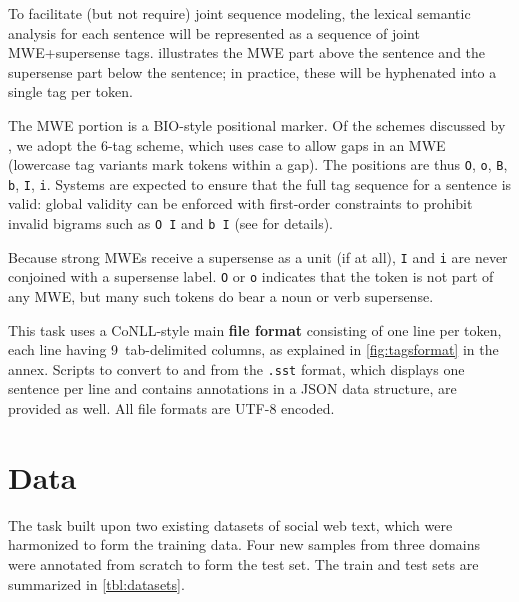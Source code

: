 \documentclass[11pt,letterpaper]{article}
\newcommand{\shortversion}[1]{}
\newcommand{\longversion}[1]{#1} %
\begin{document}
\longversion{To facilitate (but not require) joint sequence modeling, 
the lexical semantic}\shortversion{The} analysis for each sentence will be represented as 
a sequence of joint MWE+supersense tags.  illustrates 
the MWE part above the sentence and the supersense part below\longversion{ the sentence}; 
in practice, these will be hyphenated into a single tag per token.

The MWE portion is a BIO-style \citep{ramshaw-95} 
positional marker. Of the schemes discussed by \citet{schneider-14}, 
we adopt the 6-tag scheme, which uses case to allow gaps in an MWE (lowercase tag variants mark 
tokens within a gap).
The positions are thus \texttt{O}, \texttt{o}, \texttt{B}, \texttt{b},
\texttt{I}, \texttt{i}.
Systems are expected to ensure that the full tag sequence for a sentence is valid: 
global validity can be enforced with first-order constraints 
to prohibit invalid bigrams such as \texttt{O~I} and \texttt{b~I} (see \citealp{schneider-14} for details).

Because strong MWEs receive a supersense as a unit (if at all), 
\texttt{I} and \texttt{i} are never conjoined with a supersense label.
\texttt{O} or \texttt{o} indicates that the token is not part of any MWE, 
but many such tokens do bear a noun or verb supersense.

This task uses a CoNLL-style main \textbf{file format}
consisting of one line per token, each line having 9~tab-delimited columns, 
as explained in \cref{fig:tagsformat} in the annex.
Scripts to convert to and from the \texttt{.sst} format, which displays one sentence per line 
and contains annotations in a JSON data structure, are provided as well.
\longversion{All file formats are UTF-8 encoded.}



\section{Data}\label{sec:data}

The task built upon two existing datasets of social web text, which were 
harmonized to form the training data. Four new samples from three domains 
were annotated from scratch to form the test set.
The train and test sets are summarized in \cref{tbl:datasets}. 
\end{document}
